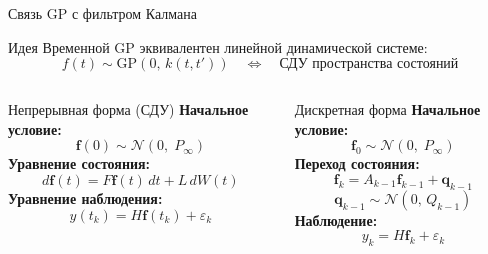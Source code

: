 \documentclass{beamer}
\begin{document}
\begin{frame}{Связь GP с фильтром Калмана}
\footnotesize

\begin{block}{\footnotesize Идея}
    Временной GP эквивалентен линейной динамической системе:
    $$
        f(t) \sim \mathrm{GP}(0,\, k(t,t'))
        \quad\Longleftrightarrow\quad
        \text{СДУ пространства состояний}
    $$
\end{block}

\begin{columns}[T]

    \begin{block}{\footnotesize Непрерывная форма (СДУ)}
        \vspace{2pt}
        \textbf{Начальное условие:}
        $$
            \mathbf{f}(0) \sim \mathcal{N}(0,\; P_\infty)
        $$
        \textbf{Уравнение состояния:}
        $$
            d\mathbf{f}(t) = F\mathbf{f}(t)\,dt + L\,dW(t)
        $$
        \textbf{Уравнение наблюдения:}
        $$
            y(t_k) = H\mathbf{f}(t_k) + \varepsilon_k
        $$
    \end{block}

    \begin{block}{\footnotesize Дискретная форма}
        \vspace{2pt}
        \textbf{Начальное условие:}
        $$
            \mathbf{f}_0 \sim \mathcal{N}(0,\; P_\infty)
        $$
        \textbf{Переход состояния:}
        $$
            \mathbf{f}_k = A_{k-1}\mathbf{f}_{k-1} + \mathbf{q}_{k-1}
        $$
        $$
            \mathbf{q}_{k-1} \sim \mathcal{N}(0,\, Q_{k-1})
        $$
        \textbf{Наблюдение:}
        $$
            y_k = H\mathbf{f}_k + \varepsilon_k
        $$
    \end{block}

\end{columns}

\end{frame}
\end{document}
